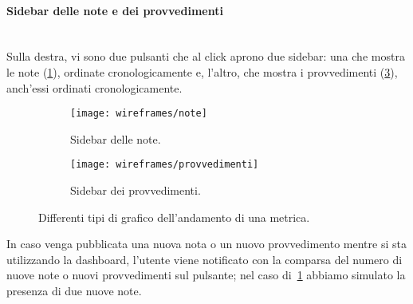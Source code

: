 \documentclass[../../../main.tex]{subfiles}
\begin{document}
\clearpage
\paragraph{Sidebar delle note e dei provvedimenti}\mbox{}\\
Sulla destra, vi sono due pulsanti che al click aprono due sidebar: una che mostra le note (\ref{fig:note}), ordinate cronologicamente e, l'altro, che mostra i provvedimenti (\ref{fig:provvedimenti}), anch'essi ordinati cronologicamente. 
\begin{figure}[H]
    \begin{subfigure}[b]{0.5\textwidth}
        \centering
        \texttt{[image: wireframes/note]}
        \caption{Sidebar delle note.}
        \label{fig:note}
    \end{subfigure}
\hfill
    \begin{subfigure}[b]{0.5\textwidth}
        \centering
        \texttt{[image: wireframes/provvedimenti]}
        \caption{Sidebar dei provvedimenti.}
        \label{fig:provvedimenti}
    \end{subfigure}
    \caption{Differenti tipi di grafico dell'andamento di una metrica.}
\end{figure}
In caso venga pubblicata una nuova nota o un nuovo provvedimento mentre si sta utilizzando la dashboard, l'utente viene notificato con la comparsa del numero di nuove note o nuovi provvedimenti sul pulsante; nel caso di~\ref{fig:note} abbiamo simulato la presenza di due nuove note.

\clearpage
\end{document}
